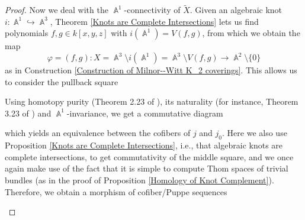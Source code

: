 \documentclass[english]{amsart}
\theoremstyle{definition}
\DeclareMathOperator{\A}{\mathbb{A}}
\DeclareMathOperator{\komma}{\hspace{-3pt},}
\DeclareMathOperator{\Th}{Th}
\begin{document}
\begin{proof}
Now we deal with the $\A^1$-connectivity of $\widetilde{X}$. Given an algebraic knot $i \colon \A^1 \hookrightarrow \A^3$, Theorem \ref{Knots are Complete Intersections} lets us find polynomials $f,g \in k[x,y,z]$ with $i(\A^1) = V(f,g)$, from which we obtain the map
$$\varphi = (f,g) \colon X = \A^3 \setminus i(\A^1) = \A^3 \setminus V(f,g) \rightarrow \A^2 \setminus \lbrace 0 \rbrace$$
as in Construction \ref{Construction of Milnor--Witt K_2 coverings}. This allows us to consider the pullback square
\begin{center}
\end{center}
Using homotopy purity (Theorem 2.23 of \cite{MR1813224}), its naturality (for instance, Theorem 3.23 of \cite{MR3570135}) and $\A^1$-invariance, we get a commutative diagram
\begin{center}
\end{center}
which yields an equivalence between the cofibers of $j$ and $j_0$. Here we also use Proposition \ref{Knots are Complete Intersections}, i.e., that algebraic knots are complete intersections, to get commutativity of the middle square, and we once again make use of the fact that it is simple to compute Thom spaces of trivial bundles (as in the proof of Proposition \ref{Homology of Knot Complement}). Therefore, we obtain a morphism of cofiber/Puppe sequences
\begin{center}
\end{center}
\end{proof}
\end{document}
